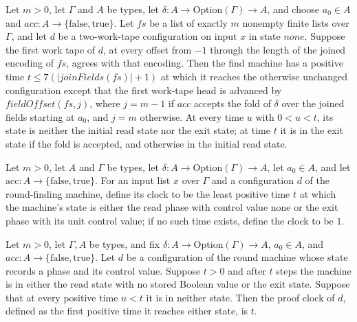 \begin{theorem}
\label{Turing.rt_find_entry}
\leanok
{}
Let $m>0$, let $\Gamma$ and $A$ be types, let $\delta:A\to\mathrm{Option}(\Gamma)\to A$,
and choose $a_0\in A$ and $acc:A\to\{\mathrm{false},\mathrm{true}\}$. Let $fs$ be a list
of exactly $m$ nonempty finite lists over $\Gamma$, and let $d$ be a two-work-tape
configuration on input $x$ in state $none$. Suppose the first work tape of $d$, at every
offset from $-1$ through the length of the joined encoding of $fs$, agrees with that
encoding. Then the find machine has a positive time $t\le 7(|joinFields(fs)|+1)$ at
which it reaches the otherwise unchanged configuration except that the first work-tape
head is advanced by $fieldOffset(fs,j)$, where $j=m-1$ if $acc$ accepts the fold of
$\delta$ over the joined fields starting at $a_0$, and $j=m$ otherwise. At every time
$u$ with $0<u<t$, its state is neither the initial read state nor the exit state; at
time $t$ it is in the exit state if the fold is accepted, and otherwise in the initial
read state.
\end{theorem}

\begin{definition}
\label{Turing.rt_findClock}
\leanok
{}
Let $m>0$, let $A$ and $\Gamma$ be types, let $\delta:A\to\mathrm{Option}(\Gamma)\to A$,
let $a_0\in A$, and let $\mathrm{acc}:A\to\{\mathrm{false},\mathrm{true}\}$. For an
input list $x$ over $\Gamma$ and a configuration $d$ of the round-finding machine,
define its clock to be the least positive time $t$ at which the machine's state is
either the read phase with control value none or the exit phase with its unit control
value; if no such time exists, define the clock to be $1$.
\end{definition}

\begin{theorem}
\label{Turing.rt_findClock_eq}
\leanok
{}
Let $m>0$, let $\Gamma,A$ be types, and fix $\delta:A\to\mathrm{Option}(\Gamma)\to A$,
$a_0\in A$, and $acc:A\to\{\mathrm{false},\mathrm{true}\}$. Let $d$ be a configuration
of the round machine whose state records a phase and its control value. Suppose $t>0$ and
after $t$ steps the machine is in either the read state with no stored Boolean value or
the exit state. Suppose that at every positive time $u<t$ it is in neither state. Then
the proof clock of $d$, defined as the first positive time it reaches either state, is $t$.
\end{theorem}

